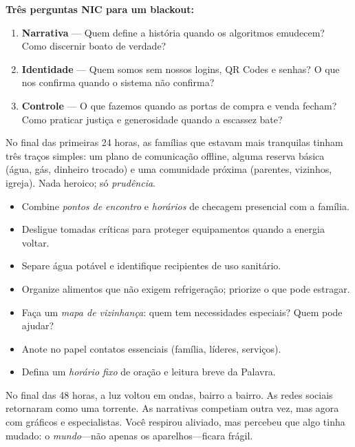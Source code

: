 \begin{nicbox}
\textbf{Três perguntas NIC para um blackout:}\\[-1ex]
\begin{enumerate}[leftmargin=*,nosep]
  \item \textbf{Narrativa} --- Quem define a história quando os algoritmos emudecem? Como discernir boato de verdade?
  \item \textbf{Identidade} --- Quem somos sem nossos logins, QR Codes e senhas? O que nos confirma quando o sistema não confirma?
  \item \textbf{Controle} --- O que fazemos quando as portas de compra e venda fecham? Como praticar justiça e generosidade quando a escassez bate?
\end{enumerate}
\end{nicbox}

No final das primeiras 24 horas, as famílias que estavam mais tranquilas tinham três traços simples: um plano de comunicação offline, alguma reserva básica (água, gás, dinheiro trocado) e uma comunidade próxima (parentes, vizinhos, igreja). Nada heroico; só \textit{prudência}.

\begin{checklist}[title={Primeiras 24 horas: ações simples}]
\begin{itemize}[leftmargin=*,noitemsep]
  \item Combine \textit{pontos de encontro} e \textit{horários} de checagem presencial com a família.
  \item Desligue tomadas críticas para proteger equipamentos quando a energia voltar.
  \item Separe água potável e identifique recipientes de uso sanitário.
  \item Organize alimentos que não exigem refrigeração; priorize o que pode estragar.
  \item Faça um \textit{mapa de vizinhança}: quem tem necessidades especiais? Quem pode ajudar?
  \item Anote no papel contatos essenciais (família, líderes, serviços).
  \item Defina um \textit{horário fixo} de oração e leitura breve da Palavra.
\end{itemize}
\end{checklist}

No final das 48 horas, a luz voltou em ondas, bairro a bairro. As redes sociais retornaram como uma torrente. As narrativas competiam outra vez, mas agora com gráficos e especialistas. Você respirou aliviado, mas percebeu que algo tinha mudado: o \emph{mundo}---não apenas os aparelhos---ficara frágil.

